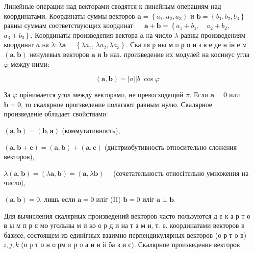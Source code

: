 \documentclass[10pt]{article}
\begin{document}
Линейные операции над векторами сводятся к линейным операциям над координатами. Координаты суммы векторов $\boldsymbol{a}=\left\{a_{1}, a_{2}, a_{3}\right\}$ и $\boldsymbol{b}=\left\{b_{1}, b_{2}, b_{3}\right\}$ равны суммам соответствующих координат: $\quad \boldsymbol{a}+\boldsymbol{b}=\left\{a_{1}+b_{1}, \quad a_{2}+b_{2}\right.$, $\left.a_{3}+b_{3}\right\}$. Координаты произведепия вектора $\boldsymbol{a}$ на число $\lambda$ равны произведениям координат $a$ на $\lambda: \lambda \boldsymbol{a}=\left\{\lambda a_{1}\right.$, $\left.\lambda a_{2}, \lambda a_{3}\right\}$. Ска ля р ны м п р о и з в е де н ін е м $(\boldsymbol{a}, \boldsymbol{b})$ ненулевых векторов $\boldsymbol{a}$ и $\boldsymbol{b}$ наз. произведение их модулей на косинус угла $\varphi$ между ними:



\[

(\boldsymbol{a}, \boldsymbol{b})=|a||b| \cos \varphi

\]



За $\varphi$ прінимается угол между векторами, не превосходящий $\pi$. Если $\boldsymbol{a}=0$ или $\boldsymbol{b}=0$, то скалярное прогзведение полагают равным нулю. Скалярное произведеніе обладает свойствами:



$(\boldsymbol{a}, \boldsymbol{b})=(\boldsymbol{b}, \boldsymbol{a})$ (коммутативность),



$(\boldsymbol{a}, \boldsymbol{b}+\boldsymbol{c})=(\boldsymbol{a}, \boldsymbol{b})+(\boldsymbol{a}, \boldsymbol{c})$ (дистриобутивность относительно сложения векторов),



$\lambda(\boldsymbol{a}, \boldsymbol{b})=(\lambda \boldsymbol{a}, \boldsymbol{b})=(\boldsymbol{a}, \lambda \boldsymbol{b}) \quad$ (сочетательность относітельно умножения на число),



$(\boldsymbol{a}, \boldsymbol{b})=0$, лишь если $\boldsymbol{a}=0$ иліг (II) $\boldsymbol{b}=0$ иліг $\boldsymbol{a} \perp \boldsymbol{b}$.



Для вычисления скалярных произведений векторов часто пользуются д е к а р т о в ы м п р я мо угольны м и ко о р д и на т а м и, т. е. координатами векторов в базисе, состоящем из единігных взаимно перпендикулярных векторов (о р т о в) $i, j, k$ (о р т о н о рм и р о а н н й ба з и с). Скалярное произведение векторов
\end{document}
